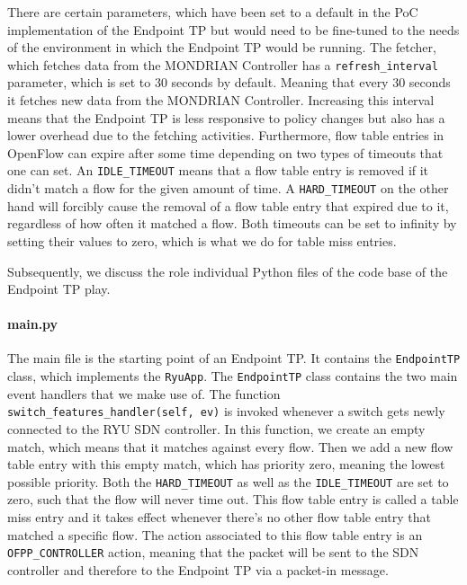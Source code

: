 There are certain parameters, which have been set to a default in the \acs{PoC} implementation of the Endpoint \acs{TP} but would need to be fine-tuned to the needs of the environment in which the Endpoint \acs{TP} would be running. The fetcher, which fetches data from the MONDRIAN Controller has a \texttt{refresh\_interval} parameter, which is set to 30 seconds by default. Meaning that every 30 seconds it fetches new data from the MONDRIAN Controller. Increasing this interval means that the Endpoint TP is less responsive to policy changes but also has a lower overhead due to the fetching activities. Furthermore, flow table entries in OpenFlow can expire after some time depending on two types of timeouts that one can set. An \texttt{IDLE\_TIMEOUT} means that a flow table entry is removed if it didn't match a flow for the given amount of time. A \texttt{HARD\_TIMEOUT} on the other hand will forcibly cause the removal of a flow table entry that expired due to it, regardless of how often it matched a flow. Both timeouts can be set to infinity by setting their values to zero, which is what we do for table miss entries.

Subsequently, we discuss the role individual Python files of the code base of the Endpoint \acs{TP} play.

\paragraph{main.py} The main file is the starting point of an Endpoint \acs{TP}. It contains the \texttt{EndpointTP} class, which implements the \texttt{RyuApp}. The \texttt{EndpointTP} class contains the two main event handlers that we make use of. The function \texttt{switch\_features\_handler(self, ev)} is invoked whenever a switch gets newly connected to the RYU \acs{SDN} controller. In this function, we create an empty match, which means that it matches against every flow. Then we add a new flow table entry with this empty match, which has priority zero, meaning the lowest possible priority. Both the \texttt{HARD\_TIMEOUT} as well as the \texttt{IDLE\_TIMEOUT} are set to zero, such that the flow will never time out. This flow table entry is called a table miss entry and it takes effect whenever there's no other flow table entry that matched a specific flow. The action associated to this flow table entry is an \texttt{OFPP\_CONTROLLER} action, meaning that the packet will be sent to the \acs{SDN} controller and therefore to the Endpoint \acs{TP} via a packet-in message.

